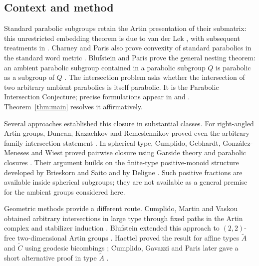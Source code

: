 \subsection{Context and method}

Standard parabolic subgroups retain the Artin presentation of their
submatrix: this unrestricted embedding theorem is due to van der Lek
\cite{VanDerLek1983}, with subsequent treatments in
\cite{Paris1997,CharneyParis2014}.  Charney and Paris also prove convexity of standard parabolics in the
standard word metric \cite[Theorem~1.2]{CharneyParis2014}.
Blufstein and Paris prove the general nesting theorem: an ambient
parabolic subgroup contained in a parabolic subgroup $Q$ is parabolic
as a subgroup of $Q$ \cite[Theorem~1.1]{BlufsteinParis2023}.
The intersection problem asks whether the intersection of two arbitrary
ambient parabolics is itself parabolic.  It is the Parabolic Intersection Conjecture; precise
formulations appear in \cite[Conjecture~1]{Godelle2023} and
\cite[Section~3, Conjecture~4]{Cumplido2026Survey}.
Theorem~\ref{thm:main} resolves it affirmatively.

Several approaches established this closure in substantial classes.
For right-angled Artin groups, Duncan, Kazachkov and Remeslennikov proved
even the arbitrary-family intersection statement
\cite[Proposition~2.8]{DuncanKazachkovRemeslennikov2007}.
In spherical type, Cumplido, Gebhardt, Gonz\'alez-Meneses and Wiest
proved pairwise closure using Garside theory and parabolic closures
\cite[Theorem~9.5]{CumplidoEtAl2019}.  Their argument builds on the
finite-type positive-monoid structure developed by Brieskorn and Saito
and by Deligne \cite{BrieskornSaito1972,Deligne1972}.
Such positive fractions are available inside spherical subgroups;
they are not available as a general premise for the ambient groups
considered here.

Geometric methods provide a different route.  Cumplido, Martin and
Vaskou obtained arbitrary intersections in large type through fixed
paths in the Artin complex and stabilizer induction
\cite[Theorem~A and Theorem~11]{CumplidoMartinVaskou2023}.
Blufstein extended this approach to $(2,2)$-free two-dimensional Artin
groups \cite[Theorem~1.3]{Blufstein2022}.
Haettel proved the result for affine types $\widetilde A$ and
$\widetilde C$ using geodesic bicombings
\cite[Corollary~8.3]{Haettel2024}; Cumplido, Gavazzi and Paris later
gave a short alternative proof in type $\widetilde A$
\cite[Theorem~1]{CumplidoGavazziParis2024}.

